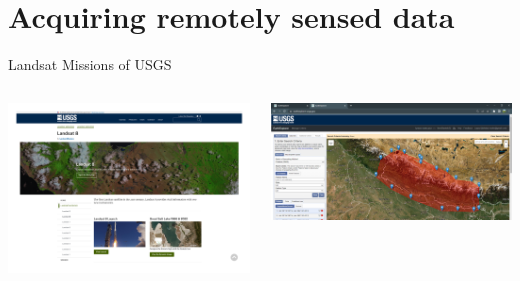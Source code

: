 \documentclass[10pt,dvipsnames,ignorenonframetext,aspectratio=169]{beamer}
\begin{document}
\hypertarget{acquiring-remotely-sensed-data}{%
\section{Acquiring remotely sensed
data}\label{acquiring-remotely-sensed-data}}

\begin{frame}{Landsat Missions of USGS}
\protect\hypertarget{landsat-missions-of-usgs}{}
\begin{columns}[T, onlytextwidth]



\begin{center}\includegraphics[width=0.98\linewidth]{../images/usgs_official_portal_p1} \end{center}




\begin{center}\includegraphics[width=0.98\linewidth]{../images/usgs_landsat_mapping_earth_explorer} \end{center}

\end{columns}
\end{frame}
\end{document}
